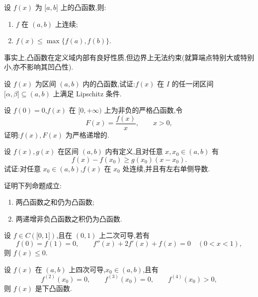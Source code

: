 \documentclass[../../数学分析培优讲义.tex]{subfiles}
\begin{document}
\begin{theorem}[\markstar]
设 $f(x)$ 为 $\lbrack a,b\rbrack$ 上的凸函数,则:
\begin{enumerate}[label=(\arabic*)]
    \item $f$ 在 $(a,b)$ 上连续;
    \item $f(x)\leq\max\{f(a),f(b)\}$.
\end{enumerate}
\end{theorem}

\begin{remark}
事实上,凸函数在定义域内部有良好性质,但边界上无法约束(就算端点特别大或特别小,亦不影响其凹凸性).
\end{remark}

\begin{example}
设 $f(x)$ 为区间 $(a,b)$ 内的凸函数,试证:$f(x)$ 在 $I$ 的任一闭区间 $\lbrack \alpha,\beta\rbrack\subseteq(a,b)$ 上满足 Lipschitz 条件.
\end{example}
\exampleblank

\begin{example}
设 $f(0)=0$,$f(x)$ 在 $\lbrack 0,+\infty)$ 上为非负的严格凸函数,令
\[
    F(x)=\dfrac{f(x)}{x},\qquad x>0,
\]
证明:$f(x),F(x)$ 为严格递增的.
\end{example}
\exampleblank

\begin{example}
设 $f(x),g(x)$ 在区间 $(a,b)$ 内有定义,且对任意 $x,x_0\in(a,b)$ 有
\[
    f(x)-f(x_0)\geq g(x_0)(x-x_0).
\]
试证:对任意 $x_0\in(a,b)$,$f(x)$ 在 $x_0$ 处连续,并且有左右单侧导数.
\end{example}
\exampleblank

\begin{example}
证明下列命题成立:
\begin{enumerate}[label=(\arabic*)]
    \item 两凸函数之和仍为凸函数;
    \item 两递增非负凸函数之积仍为凸函数.
\end{enumerate}
\end{example}
\exampleblank

\begin{example}
设 $f\in C(\lbrack 0,1\rbrack)$,且在 $(0,1)$ 上二次可导,若有
\[
    f(0)=f(1)=0,
    \qquad f''(x)+2f'(x)+f(x)=0\quad(0<x<1),
\]
则 $f(x)\leq0$.
\end{example}
\exampleblank

\begin{example}
设 $f(x)$ 在 $(a,b)$ 上四次可导,$x_0\in(a,b)$,且有
\[
    f^{(2)}(x_0)=0,
    \qquad f^{(3)}(x_0)=0,
    \qquad f^{(4)}(x_0)>0,
\]
则 $f(x)$ 是下凸函数.
\end{example}
\exampleblank
\end{document}
